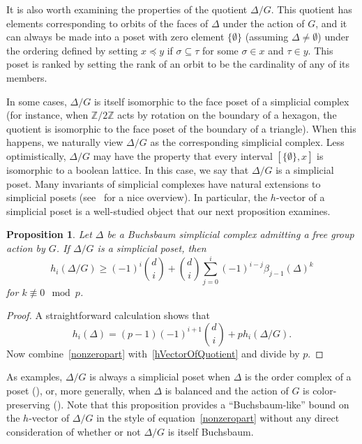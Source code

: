 \documentclass[10pt]{amsart}
\newtheorem{prop}[theo]{Proposition}
\theoremstyle{definition}
\newcommand{\ZZ}{{\mathbb Z}}
\begin{document}
It is also worth examining the properties of the quotient $\Delta/G$. This quotient has elements corresponding to orbits of the faces of $\Delta$ under the action of $G$, and it can always be made into a poset with zero element $\{\emptyset\}$ (assuming $\Delta\not=\emptyset$) under the ordering defined by setting $x\preceq y$ if $\sigma\subseteq \tau$ for some $\sigma\in x$ and $\tau\in y$. This poset is ranked by setting the rank of an orbit to be the cardinality of any of its members.

In some cases, $\Delta/G$ is itself isomorphic to the face poset of a simplicial complex (for instance, when $\ZZ/2\ZZ$ acts by rotation on the boundary of a hexagon, the quotient is isomorphic to the face poset of the boundary of a triangle). When this happens, we naturally view $\Delta/G$ as the corresponding simplicial complex. Less optimistically, $\Delta/G$ may have the property that every interval $[\{\emptyset\}, x]$ is isomorphic to a boolean lattice. In this case, we say that $\Delta/G$ is a simplicial poset. Many invariants of simplicial complexes have natural extensions to simplicial posets (see~\cite{StanleyPosets} for a nice overview). In particular, the $h$-vector of a simplicial poset is a well-studied object that our next proposition examines.

\begin{prop}
Let $\Delta$ be a Buchsbaum simplicial complex admitting a free group action by $G$. If $\Delta/G$ is a simplicial poset, then
\[
h_i(\Delta/G)\ge (-1)^i\binom{d}{i}+\binom{d}{i}\sum_{j=0}^i(-1)^{i-j}\beta_{j-1}(\Delta)^k
\]
for $k\not\equiv 0 \mod p$.
\end{prop}

\begin{proof}
A straightforward calculation shows that
\begin{equation}\label{hVectorOfQuotient}
h_i(\Delta)=(p-1)(-1)^{i+1}\binom{d}{i}+p h_i(\Delta/G).
\end{equation}
Now combine~\eqref{nonzeropart} with~\eqref{hVectorOfQuotient} and divide by $p$.
\end{proof}

As examples, $\Delta/G$ is always a simplicial poset when $\Delta$ is the order complex of a poset (\cite[Section~6]{Garsia}), or, more generally, when $\Delta$ is balanced and the action of $G$ is color-preserving (\cite{Reiner}). Note that this proposition provides a ``Buchsbaum-like'' bound on the $h$-vector of $\Delta/G$ in the style of equation~\eqref{nonzeropart} without any direct consideration of whether or not $\Delta/G$ is itself Buchsbaum.
\end{document}
